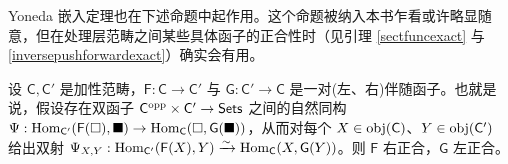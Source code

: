 
Yoneda 嵌入定理也在下述命题中起作用。这个命题被纳入本书乍看或许略显随意，但在处理层范畴之间某些具体函子的正合性时（见引理 \ref{sectfuncexact} 与 \ref{inversepushforwardexact}）确实会有用。

\begin{Pro}\label{adjointfunc}
	设 $\mathsf{C},\mathsf{C}'$ 是加性范畴，$\mathsf{F}:\mathsf{C}\rightarrow\mathsf{C}'$ 与 $\mathsf{G}:\mathsf{C}'\rightarrow\mathsf{C}$ 是一对\textup(左、右\textup)伴随函子。也就是说，假设存在双函子 $\mathsf{C}^\textup{opp}\times\mathsf{C}'\rightarrow\mathsf{Sets}$ 之间的自然同构 $\Psi:\textup{Hom}_{\mathsf{C}'}(\mathsf{F}(\square),\blacksquare)\rightarrow\textup{Hom}_\mathsf{C}(\square,\mathsf{G}(\blacksquare))$，从而对每个 $X\in\textup{obj}(\mathsf{C})$、$Y\in\textup{obj}(\mathsf{C}')$ 给出双射 $\Psi_{X,Y}:\textup{Hom}_{\mathsf{C}'}(\mathsf{F}(X),Y)\xrightarrow{\sim}\textup{Hom}_\mathsf{C}(X,\mathsf{G}(Y))$。则 $\mathsf{F}$ 右正合，$\mathsf{G}$ 左正合。
\end{Pro}

